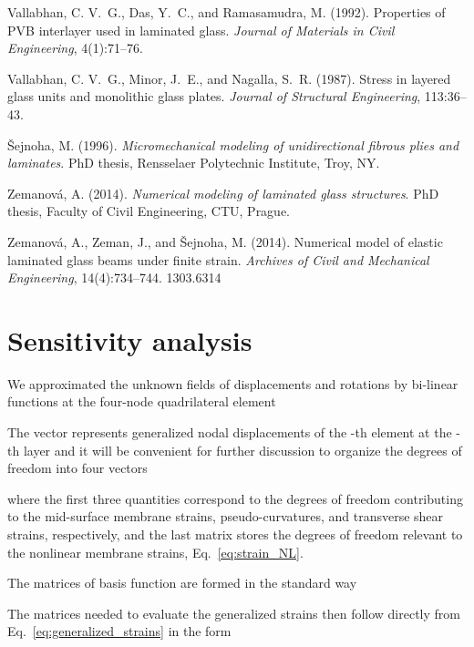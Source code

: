 \documentclass[11pt]{article}
\begin{document}
\begin{thebibliography}{10}
Vallabhan, C. V.~G., Das, Y.~C., and Ramasamudra, M. (1992).
Properties of {P}{V}{B} interlayer used in laminated glass.
{\em Journal of Materials in Civil Engineering}, 4(1):71--76.

Vallabhan, C. V.~G., Minor, J.~E., and Nagalla, S.~R. (1987).
Stress in layered glass units and monolithic glass plates.
{\em Journal of Structural Engineering}, 113:36--43.

\v{S}ejnoha, M. (1996).
{\em Micromechanical modeling of unidirectional fibrous plies and
  laminates}.
PhD thesis, Rensselaer Polytechnic Institute, Troy, NY.

Zemanov\'{a}, A. (2014).
{\em Numerical modeling of laminated glass structures}.
PhD thesis, Faculty of Civil Engineering, CTU, Prague.

Zemanov\'{a}, A., Zeman, J., and \v{S}ejnoha, M. (2014).
Numerical model of elastic laminated glass beams under finite strain.
{\em Archives of Civil and Mechanical Engineering}, 14(4):734--744. 1303.6314

\end{thebibliography}
\appendix
\section{Sensitivity analysis}\label{app:sensitivity_analysis}
We approximated the unknown fields of displacements and rotations by bi-linear functions at the four-node quadrilateral element

The vector   represents generalized nodal
displacements of the -th element at the -th layer and it will be convenient for further
discussion to organize the degrees of freedom into four vectors 

where the first three quantities correspond to the degrees of freedom contributing to the mid-surface membrane
strains, pseudo-curvatures, and transverse shear strains, respectively, and the last matrix  stores the degrees of freedom
relevant to the nonlinear membrane strains, Eq.~\eqref{eq:strain_NL}. 

The matrices of basis function are formed in the standard way



The matrices needed to evaluate the generalized strains then follow directly
from Eq.~\eqref{eq:generalized_strains} in the form
\end{document}
